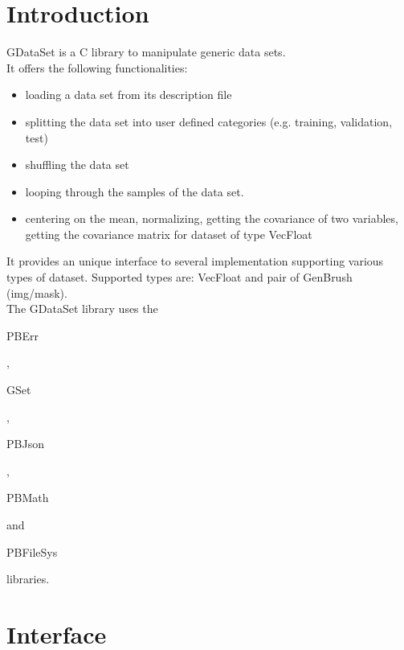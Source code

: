 \section*{Introduction}

GDataSet is a C library to manipulate generic data sets.\\

It offers the following functionalities:\\
\begin{itemize}
\item loading a data set from its description file
\item splitting the data set into user defined categories (e.g. training, validation, test)
\item shuffling the data set
\item looping through the samples of the data set. 
\item centering on the mean, normalizing, getting the covariance of two variables, getting the covariance matrix for dataset of type VecFloat
\end{itemize}

It provides an unique interface to several implementation supporting various types of dataset. Supported types are: VecFloat and pair of GenBrush (img/mask).\\

The GDataSet library uses the \begin{ttfamily}PBErr\end{ttfamily}, \begin{ttfamily}GSet\end{ttfamily}, \begin{ttfamily}PBJson\end{ttfamily}, \begin{ttfamily}PBMath\end{ttfamily} and \begin{ttfamily}PBFileSys\end{ttfamily} libraries.\\

\section{Interface}

\begin{scriptsize}
\begin{ttfamily}

\end{ttfamily}
\end{scriptsize}

